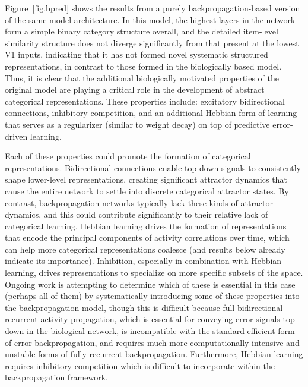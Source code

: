 \documentclass[12pt,twoside]{naturefigs}  %
\newif\myifpdf
\begin{document}
Figure~\ref{fig.bpred} shows the results from a purely backpropagation-based version of the same model architecture.  In this model, the highest layers in the network form a simple binary category structure overall, and the detailed item-level similarity structure does not diverge significantly from that present at the lowest V1 inputs, indicating that it has not formed novel systematic structured representations, in contrast to those formed in the biologically based model.  Thus, it is clear that the additional biologically motivated properties of the original model are playing a critical role in the development of abstract categorical representations. These properties include: excitatory bidirectional connections, inhibitory competition, and an additional Hebbian form of learning that serves as a regularizer (similar to weight decay) on top of predictive error-driven learning\cite{OReilly98,OReillyMunakata00}.

Each of these properties could promote the formation of categorical representations. Bidirectional connections enable top-down signals to consistently shape lower-level representations, creating significant attractor dynamics that cause the entire network to settle into discrete categorical attractor states. By contrast, backpropagation networks typically lack these kinds of attractor dynamics, and this could contribute significantly to their relative lack of categorical learning.  Hebbian learning drives the formation of representations that encode the principal components of activity correlations over time, which can help more categorical representations coalesce (and results below already indicate its importance).  Inhibition, especially in combination with Hebbian learning, drives representations to specialize on more specific subsets of the space.  Ongoing work is attempting to determine which of these is essential in this case (perhaps all of them) by systematically introducing some of these properties into the backpropagation model, though this is difficult because full bidirectional recurrent activity propagation, which is essential for conveying error signals top-down in the biological network, is incompatible with the standard efficient form of error backpropagation, and requires much more computationally intensive and unstable forms of fully recurrent backpropagation\cite{WilliamsZipser92,Pineda87}.  Furthermore, Hebbian learning requires inhibitory competition which is difficult to incorporate within the backpropagation framework.
\end{document}
